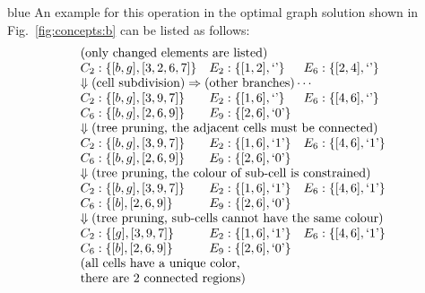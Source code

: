 \documentclass[journal]{IEEEtran}
\begin{document}
\begin{color}{blue}
An example for this operation in the optimal graph solution shown in Fig.~\ref{fig:concepts:b} can be listed as follows:  
\begin{equation}
\begin{array}{lll}
\multicolumn{2}{l}{\mbox{(only changed elements are listed)}} &\\
C_2:\{[b, g], [3, 2, 6, 7]\}     & E_2:\{ [1, 2], \mbox{`'}\} & E_6:\{[2, 4], \mbox{`'}\}\\
\multicolumn{3}{l}{\Downarrow (\mbox{cell subdivision})\Rightarrow \mbox{(other branches)}\cdots}\\
C_2:\{[b, g], [3, 9, 7]\} &E_2:\{[1, 6], \mbox{`'}\}&E_6:\{[4, 6], \mbox{`'}\}\\
C_6:\{[b, g], [2, 6, 9]\} &E_9:\{[2, 6], \mbox{`0'}\}&  \\
\multicolumn{3}{l}{\Downarrow (\mbox{tree pruning, the adjacent cells must be connected})}\\
C_2:\{[b, g], [3, 9, 7]\} &E_2:\{[1, 6], \mbox{`1'}\}&E_6:\{[4, 6], \mbox{`1'}\}\\
C_6:\{[b, g], [2, 6, 9]\} &E_9:\{[2, 6], \mbox{`0'}\}&  \\
\multicolumn{3}{l}{\Downarrow (\mbox{tree pruning, the colour of sub-cell is constrained})}\\
C_2:\{[b, g], [3, 9, 7]\} &E_2:\{[1, 6], \mbox{`1'}\}&E_6:\{[4, 6], \mbox{`1'}\}\\
C_6:\{[b], [2, 6, 9]\} &E_9:\{[2, 6], \mbox{`0'}\}&  \\
\multicolumn{3}{l}{\Downarrow (\mbox{tree pruning, sub-cells cannot have the same colour})}\\
C_2:\{[g], [3, 9, 7]\} &E_2:\{[1, 6], \mbox{`1'}\}&E_6:\{[4, 6], \mbox{`1'}\}\\
C_6:\{[b], [2, 6, 9]\} &E_9:\{[2, 6], \mbox{`0'}\}&  \\
\multicolumn{3}{l}{\mbox{(all cells have a unique color, }} \\
\multicolumn{3}{l}{\mbox{there are 2 connected regions)}}
\end{array}
\end{equation}



\end{color}
\end{document}
